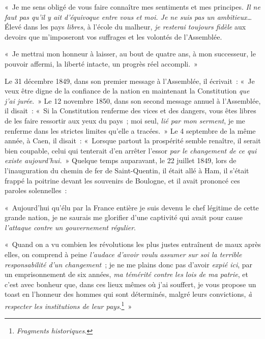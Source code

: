 \documentclass[french,twoside]{book} %
\newenvironment{quoteblock}%
  {\begin{quoting}}
  {\end{quoting}}
\newenvironment{quotebar}{%
    \def\FrameCommand{{\color{rubric!10!}\vrule width 0.5em} \hspace{0.9em}}%
    \def\OuterFrameSep{\itemsep} %
    \MakeFramed {\advance\hsize-\width \FrameRestore}
  }%
  {%
    \endMakeFramed
  }
\renewenvironment{quoteblock}%
  {%
    \savenotes
    \setstretch{0.9}
    \normalfont
    \begin{quotebar}
  }
  {%
    \end{quotebar}
    \spewnotes
  }
\begin{document}
\begin{quoteblock}
 \noindent « Je me sens obligé de vous faire connaître mes sentiments et mes principes. \emph{Il ne faut pas qu’il y ait d’équivoque entre vous et moi. Je ne suis pas un ambitieux…} Élevé dans les pays \emph{libres}, à l’école du malheur, \emph{je resterai toujours fidèle} aux devoirs que m’imposeront vos suffrages et les volontés de l’Assemblée.\par
 « Je mettrai mon honneur à laisser, au bout de quatre ans, à mon successeur, le pouvoir affermi, la liberté intacte, un progrès réel accompli. »
 \end{quoteblock}

\noindent Le 31 décembre 1849, dans son premier message à l’Assemblée, il écrivait : « Je veux être digne de la confiance de la nation en maintenant la Constitution \emph{que j’ai jurée}. » Le 12 novembre 1850, dans son second message annuel à l’Assemblée, il disait : « Si la Constitution renferme des vices et des dangers, vous êtes libres de les faire ressortir aux yeux du pays ; moi seul, \emph{lié par mon serment}, je me renferme dans les strictes limites qu’elle a tracées. » Le 4 septembre de la même année, à Caen, il disait : « Lorsque partout la prospérité semble renaître, il serait bien coupable, celui qui tenterait d’en arrêter l’essor \emph{par le changement de ce qui existe aujourd’hui.} » Quelque temps auparavant, le 22 juillet 1849, lors de l’inauguration du chemin de fer de Saint-Quentin, il était allé à Ham, il s’était frappé la poitrine devant les souvenirs de Boulogne, et il avait prononcé ces paroles solennelles :\par

\begin{quoteblock}
 \noindent « Aujourd’hui qu’élu par la France entière je suis devenu le chef légitime de cette grande nation, je ne saurais me glorifier d’une captivité qui avait pour cause \emph{l’attaque contre un gouvernement régulier}.\par
 « Quand on a vu combien les révolutions les plus justes entraînent de maux après elles, on comprend à peine \emph{l’audace d’avoir voulu assumer sur soi la terrible responsabilité d’un changement} ; je ne me plains donc pas d’avoir \emph{expié ici}, par un emprisonnement de six années, \emph{ma témérité contre les lois de ma patrie}, et c’est avec bonheur que, dans ces lieux mêmes où j’ai souffert, je vous propose un toast en l’honneur des hommes qui sont déterminés, malgré leurs convictions, \emph{à respecter les institutions de leur pays}.\footnote{\emph{Fragments historiques.}} »
 \end{quoteblock}
\end{document}

